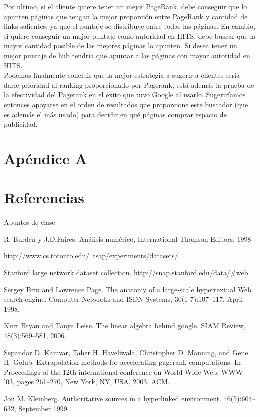 \documentclass[a4paper]{article}
\begin{document}
Por ultimo, si el cliente quiere tener un mejor PageRank, debe conseguir que lo apunten páginas que tengan la mejor proporción entre PageRank y cantidad de links salientes, ya que el puntaje se distribuye entre todas las páginas. En cambio, si quiere conseguir un mejor puntaje como autoridad en HITS, debe buscar que la mayor cantidad posible de las mejores páginas lo apunten. Si desea tener un mejor puntaje de hub tendría que apuntar a las páginas con mayor autoridad en HITS.\\
Podemos finalmente concluir que la mejor estrategia a sugerir a clientes sería darle prioridad al ranking proporcionado por Pagerank, está además la prueba de la efectividad del Pagerank en el éxito que tuvo Google al usarlo. 
Sugeriríamos entonces apoyarse en el orden de resultados que proporcione este buscador (que es además el más usado) para decidir en qué páginas comprar espacio de publicidad.

\newpage

\section{Apéndice A}
\label{sec:ApA}



\newpage

\section{Referencias}
\label{sec:ref}

Apuntes de clase

R. Burden y J.D.Faires, Análisis numérico, International Thomson Editors, 1998

http://www.cs.toronto.edu/~tsap/experiments/datasets/.

Stanford large network dataset collection. http://snap.stanford.edu/data/#web.

Sergey Brin and Lawrence Page. The anatomy of a large-scale hypertextual Web search engine. Computer Networks and ISDN Systems, 30(1-7):107–117, April 1998.

Kurt Bryan and Tanya Leise. The linear algebra behind google. SIAM Review, 48(3):569–581, 2006.

Sepandar D. Kamvar, Taher H. Haveliwala, Christopher D. Manning, and Gene H. Golub. Extrapolation methods for accelerating pagerank computations. In Proceedings of the 12th international conference on World Wide Web, WWW ’03, pages 261–270, New York, NY, USA, 2003. ACM.

Jon M. Kleinberg. Authoritative sources in a hyperlinked environment. 46(5):604–632, September 1999.
\end{document}
